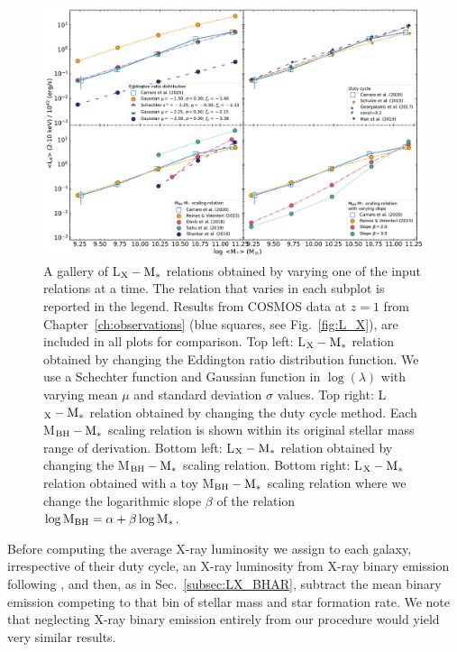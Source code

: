 \begin{figure}
\begin{center}
  \includegraphics[width=\textwidth]{Figs/Chapter3/fig2_z1.0.pdf}
  \caption{A gallery of L$_{\rm X}-{\rm M}_*$ relations obtained by varying one of the input relations at a time. The relation that varies in each subplot is reported in the legend. 
  Results from COSMOS data at $z=1$ from Chapter~\ref{ch:observations} (blue squares, see Fig.~\ref{fig:L_X}), are included in all plots for comparison.
  Top left: L$_{\rm X}-{\rm M}_*$ relation obtained by changing the Eddington ratio distribution function. We use a Schechter function and Gaussian function in $\log(\lambda)$ with varying mean $\mu$ and standard deviation $\sigma$ values.
  Top right: L$_{\rm X}-{\rm M}_*$ relation obtained by changing the duty cycle method. Each M$_{\rm BH}-{\rm M}_*$ scaling relation is shown within its original stellar mass range of derivation.
  Bottom left: L$_{\rm X}-{\rm M}_*$ relation obtained by changing the M$_{\rm BH}-{\rm M}_*$ scaling relation.
  Bottom right: L$_{\rm X}-{\rm M}_*$ relation obtained with a toy M$_{\rm BH}-{\rm M}_*$ scaling relation where we change the logarithmic slope $\beta$ of the relation $\log {\rm M}_{\rm BH} = \alpha + \beta \log {\rm M}_*$.
  }
    \label{fig:LX_M}
\end{center}
\end{figure}
Before computing the average X-ray luminosity we assign to each galaxy, irrespective of their duty cycle, an X-ray luminosity from X-ray binary emission following \citet[][Table 3]{2016ApJ...825....7L}, and then, as in Sec.~\ref{subsec:LX_BHAR}, subtract the mean binary emission competing to that bin of stellar mass and star formation rate. We note that neglecting X-ray binary emission entirely from our procedure would yield very similar results.
